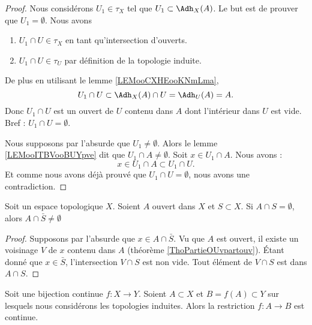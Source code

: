 \begin{proof}
	Nous considérons \( U_1\in \tau_X\) tel que \( U_1\subset \Adh_X(A)\). Le but est de prouver que \( U_1=\emptyset\). Nous avons
	\begin{enumerate}
		\item
		      \( U_1\cap U\in\tau_X\) en tant qu'intersection d'ouverts.
		\item
		      \( U_1\cap U\in \tau_U\) par définition de la topologie induite.
	\end{enumerate}
	De plus en utilisant le lemme \ref{LEMooCXHEooKNmLma},
	\begin{equation}
		U_1\cap U\subset\Adh_X(A)\cap U=\Adh_U(A)=A.
	\end{equation}
	Donc \( U_1\cap U\) est un ouvert de \( U\) contenu dans \( A\) dont l'intérieur dans \( U\) est vide. Bref : \( U_1\cap U=\emptyset\).

	Nous supposons par l'absurde que \( U_1\neq \emptyset\). Alors le lemme \ref{LEMooITBVooBUYpve} dit que \( U_1\cap A\neq \emptyset\). Soit \( x\in U_1\cap A\). Nous avons :
	\begin{equation}
		x\in U_1\cap A\subset U_1\cap U.
	\end{equation}
	Et comme nous avons déjà prouvé que \( U_1\cap U=\emptyset\), nous avons une contradiction.
\end{proof}


\begin{lemma}	\label{LEMooLKHEooRqrqkA}
	Soit un espace topologique \( X\). Soient \( A\) ouvert dans \( X\) et \( S\subset X\). Si \( A\cap S=\emptyset\),  alors \( A\cap\bar S\neq \emptyset\)
\end{lemma}

\begin{proof}
	Supposons par l'absurde que \( x\in A\cap \bar S\). Vu que \( A\) est ouvert, il existe un voisinage \( V\) de \( x\) contenu dans \( A\) (théorème \ref{ThoPartieOUvpartouv}). Étant donné que \( x\in \bar S\), l'intersection \( V\cap S\) est non vide. Tout élément de \( V\cap S\) est dans \( A\cap S\).
\end{proof}

\begin{proposition}	\label{PROPooRRWQooASUUIr}
	Soit une bijection continue \(f \colon X\to Y  \). Soient \( A\subset X\) et \( B=f(A)\subset Y\) sur lesquels nous considérons les topologies induites. Alors la restriction \(f \colon A\to B  \) est continue.
\end{proposition}

